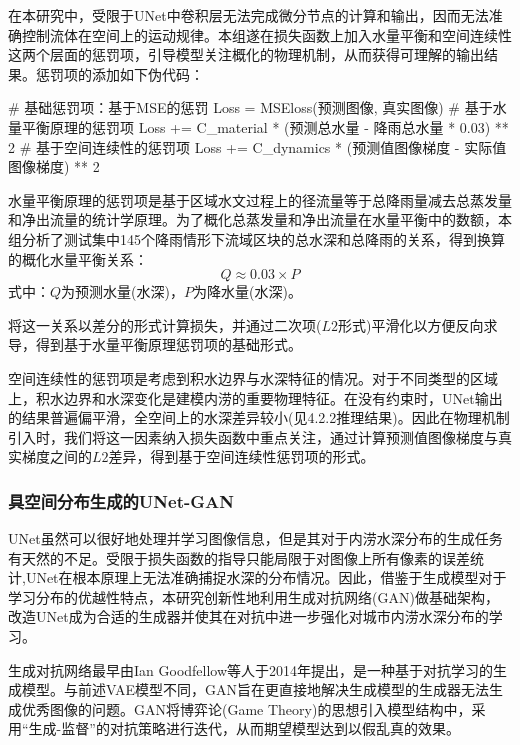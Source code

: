 \documentclass[12pt, a4paper]{article}
\begin{document}
在本研究中，受限于UNet中卷积层无法完成微分节点的计算和输出，因而无法准确控制流体在空间上的运动规律。本组遂在损失函数上加入水量平衡和空间连续性这两个层面的惩罚项，引导模型关注概化的物理机制，从而获得可理解的输出结果。惩罚项的添加如下伪代码：

\begin{python}
# 基础惩罚项：基于MSE的惩罚
Loss = MSEloss(预测图像, 真实图像)
# 基于水量平衡原理的惩罚项
Loss += C_material * (预测总水量 - 降雨总水量 * 0.03) ** 2 
# 基于空间连续性的惩罚项
Loss += C_dynamics * (预测值图像梯度 - 实际值图像梯度) ** 2 
\end{python}

水量平衡原理的惩罚项是基于区域水文过程上的径流量等于总降雨量减去总蒸发量和净出流量的统计学原理。为了概化总蒸发量和净出流量在水量平衡中的数额，本组分析了测试集中145个降雨情形下流域区块的总水深和总降雨的关系，得到换算的概化水量平衡关系：
\begin{equation}
    Q \approx 0.03 \times P
\end{equation}
式中：$Q$为预测水量(水深)，$P$为降水量(水深)。

将这一关系以差分的形式计算损失，并通过二次项($L2$形式)平滑化以方便反向求导，得到基于水量平衡原理惩罚项的基础形式。

空间连续性的惩罚项是考虑到积水边界与水深特征的情况。对于不同类型的区域上，积水边界和水深变化是建模内涝的重要物理特征。在没有约束时，UNet输出的结果普遍偏平滑，全空间上的水深差异较小(见4.2.2推理结果)。因此在物理机制引入时，我们将这一因素纳入损失函数中重点关注，通过计算预测值图像梯度与真实梯度之间的$L2$差异，得到基于空间连续性惩罚项的形式。

\subsubsection{具空间分布生成的UNet-GAN}

UNet虽然可以很好地处理并学习图像信息，但是其对于内涝水深分布的生成任务有天然的不足。受限于损失函数的指导只能局限于对图像上所有像素的误差统计,UNet在根本原理上无法准确捕捉水深的分布情况。因此，借鉴于生成模型对于学习分布的优越性特点，本研究创新性地利用生成对抗网络(GAN)做基础架构，改造UNet成为合适的生成器并使其在对抗中进一步强化对城市内涝水深分布的学习。

生成对抗网络最早由Ian Goodfellow等人于2014年提出\citep{goodfellow2014generative}，是一种基于对抗学习的生成模型。与前述VAE模型不同，GAN旨在更直接地解决生成模型的生成器无法生成优秀图像的问题。GAN将博弈论(Game Theory)的思想引入模型结构中，采用“生成-监督”的对抗策略进行迭代，从而期望模型达到以假乱真的效果。
\end{document}
